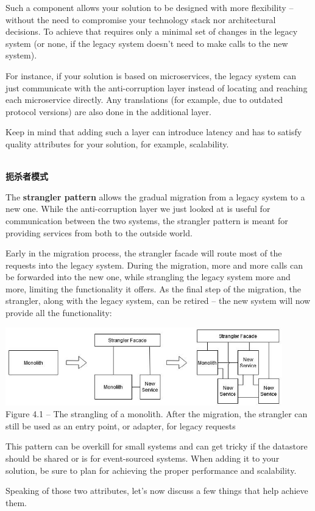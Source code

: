 Such a component allows your solution to be designed with more flexibility – without the need to compromise your technology stack nor architectural decisions. To achieve that requires only a minimal set of changes in the legacy system (or none, if the legacy system doesn't need to make calls to the new system).

For instance, if your solution is based on microservices, the legacy system can just communicate with the anti-corruption layer instead of locating and reaching each microservice directly. Any translations (for example, due to outdated protocol versions) are also done in the additional layer.

Keep in mind that adding such a layer can introduce latency and has to satisfy quality attributes for your solution, for example, scalability.

\hspace*{\fill} \\ %
\noindent
\textbf{扼杀者模式}

The \textbf{strangler pattern} allows the gradual migration from a legacy system to a new one. While the anti-corruption layer we just looked at is useful for communication between the two systems, the strangler pattern is meant for providing services from both to the outside world.

Early in the migration process, the strangler facade will route most of the requests into the legacy system. During the migration, more and more calls can be forwarded into the new one, while strangling the legacy system more and more, limiting the functionality it offers. As the final step of the migration, the strangler, along with the legacy system, can be retired – the new system will now provide all the functionality:

\begin{center}
\includegraphics[width=0.9\textwidth]{content/2/chapter4/images/1.jpg}\\
Figure 4.1 – The strangling of a monolith. After the migration, the strangler can still be used as an entry point, or adapter, for legacy requests
\end{center}

This pattern can be overkill for small systems and can get tricky if the datastore should be shared or is for event-sourced systems. When adding it to your solution, be sure to plan for achieving the proper performance and scalability.

Speaking of those two attributes, let's now discuss a few things that help achieve them.















